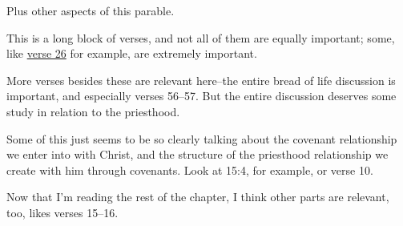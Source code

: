 \begin{compactdesc}
				\item[{\hyperref[LUKE-20-14]{Luke 20:14}}] \phantom{.}
					\begin{compactitem}
						\item Plus other aspects of this parable.
					\end{compactitem} 
				\item[{\hyperref[LUKE-22-53]{Luke 22:53}}] \phantom{.}
				\item[{\hyperref[LUKE-22-69]{Luke 22:69}}] \phantom{.}
				\item[{\hyperref[LUKE-24-49]{Luke 24:49}}] \phantom{.}
				\item[{\hyperref[JOHN-4-7]{John 4:7--14}}] \phantom{.}
				\item[{\hyperref[JOHN-5-17]{John 5:17--47}}] \phantom{.}
					\begin{compactitem}
						\item This is a long block of verses, and not all of them are equally important; some, like \hyperref[JOHN-5-26]{verse 26} for example, are extremely important.
					\end{compactitem}
				\item[{\hyperref[JOHN-6-32]{John 6:32--35}}] \phantom{.}
					\begin{compactitem}
						\item More verses besides these are relevant here--the entire bread of life discussion is important, and especially verses 56--57. But the entire discussion deserves some study in relation to the priesthood.
					\end{compactitem}
				\item[{\hyperref[JOHN-10-17]{John 10:17--18}}] \phantom{.}
				\item[{\hyperref[JOHN-14-6]{John 14:6--11}}] \phantom{.}
				\item[{\hyperref[JOHN-14-16]{John 14:16--20}}] \phantom{.}
				\item[{\hyperref[JOHN-15-1]{John 15:1--11}}] \phantom{.}
					\begin{compactitem}
						\item Some of this just seems to be so clearly talking about the covenant relationship we enter into with Christ, and the structure of the priesthood relationship we create with him through covenants. Look at 15:4, for example, or verse 10.
						\item Now that I'm reading the rest of the chapter, I think other parts are relevant, too, likes verses 15--16.
							\begin{compactitem}

\end{compactitem}
\end{compactitem}
\end{compactdesc}
